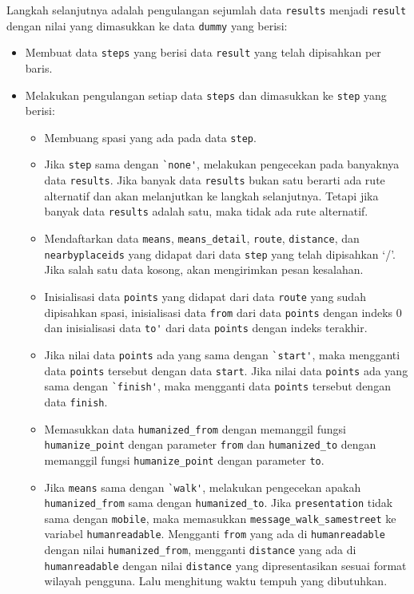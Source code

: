 Langkah selanjutnya adalah pengulangan sejumlah data \verb!results! menjadi \verb!result! dengan nilai yang dimasukkan ke data \verb!dummy! yang berisi:
\begin{itemize}
	\item Membuat data \verb!steps! yang berisi data \verb!result! yang telah dipisahkan per baris.
	\item Melakukan pengulangan setiap data \verb!steps! dan dimasukkan ke \verb!step! yang berisi:
	\begin{itemize}
		\item Membuang spasi yang ada pada data \verb!step!.
		\item Jika \verb!step! sama dengan \verb!`none'!, melakukan pengecekan pada banyaknya data \verb!results!. Jika banyak data \verb!results! bukan satu berarti ada rute alternatif dan akan melanjutkan ke langkah selanjutnya. Tetapi jika banyak data \verb!results! adalah satu, maka tidak ada rute alternatif.
		\item Mendaftarkan data \verb!means!, \verb!means_detail!, \verb!route!, \verb!distance!, dan \verb!nearbyplaceids! yang didapat dari data \verb!step! yang telah dipisahkan `/'. Jika salah satu data kosong, akan mengirimkan pesan kesalahan.
		\item Inisialisasi data \verb!points! yang didapat dari data \verb!route! yang sudah dipisahkan spasi, inisialisasi data \verb!from! dari data \verb!points! dengan indeks 0 dan inisialisasi data \verb!to'! dari data \verb!points! dengan indeks terakhir.
		\item Jika nilai data \verb!points! ada yang sama dengan \verb!`start'!, maka mengganti data \verb!points! tersebut dengan data \verb!start!. Jika nilai data \verb!points! ada yang sama dengan \verb!`finish'!, maka mengganti data \verb!points! tersebut dengan data \verb!finish!.
		 \item Memasukkan data \verb!humanized_from! dengan memanggil fungsi \verb!humanize_point! dengan parameter \verb!from! dan \verb!humanized_to! dengan memanggil fungsi \verb!humanize_point! dengan parameter \verb!to!.
		 \item Jika \verb!means! sama dengan \verb!`walk'!, melakukan pengecekan apakah  \verb!humanized_from! sama dengan \verb!humanized_to!. Jika \verb!presentation! tidak sama dengan \verb!mobile!, maka memasukkan \verb!message_walk_samestreet! ke variabel \verb!humanreadable!. Mengganti \verb!from! yang ada di \verb!humanreadable! dengan nilai \verb!humanized_from!, mengganti \verb!distance! yang ada di \verb!humanreadable! dengan nilai \verb!distance! yang dipresentasikan sesuai format wilayah pengguna. Lalu menghitung waktu tempuh yang dibutuhkan.

\end{itemize}
\end{itemize}
